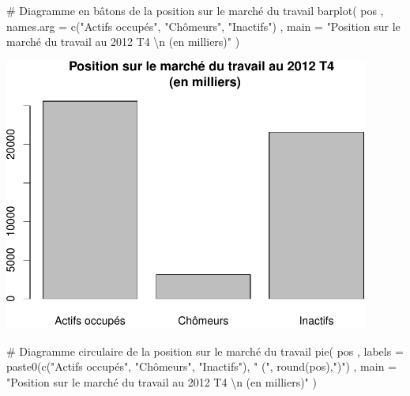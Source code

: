 \documentclass[12pt,twosided, notitlepage]{book}
\newenvironment{Shaded}{}{}
\newcommand{\KeywordTok}[1]{\textcolor[rgb]{0.00,0.00,1.00}{#1}}
\newcommand{\DataTypeTok}[1]{#1}
\newcommand{\CharTok}[1]{\textcolor[rgb]{0.00,0.50,0.50}{#1}}
\newcommand{\StringTok}[1]{\textcolor[rgb]{0.00,0.50,0.50}{#1}}
\newcommand{\CommentTok}[1]{\textcolor[rgb]{0.00,0.50,0.00}{#1}}
\newcommand{\NormalTok}[1]{#1}
\renewenvironment{Shaded}{\begin{snugshade}}{\end{snugshade}}
\begin{document}
\begin{itemize}
\begin{Shaded}
\begin{Highlighting}[]
\CommentTok{# Diagramme en bâtons de la position sur le marché du travail}
\KeywordTok{barplot}\NormalTok{(}
\NormalTok{  pos}
\NormalTok{  , }\DataTypeTok{names.arg =} \KeywordTok{c}\NormalTok{(}\StringTok{"Actifs occupés"}\NormalTok{, }\StringTok{"Chômeurs"}\NormalTok{, }\StringTok{"Inactifs"}\NormalTok{)}
\NormalTok{  , }\DataTypeTok{main =} \StringTok{"Position sur le marché du travail au 2012 T4 }\CharTok{\textbackslash{}n}\StringTok{ (en milliers)"}
\NormalTok{)}
\end{Highlighting}
\end{Shaded}

  \begin{center}\includegraphics[width=12cm]{livret_files/figure-latex/unnamed-chunk-443-1} \end{center}

\begin{Shaded}
\begin{Highlighting}[]

\CommentTok{# Diagramme circulaire de la position sur le marché du travail}
\KeywordTok{pie}\NormalTok{(}
\NormalTok{  pos}
\NormalTok{  , }\DataTypeTok{labels =} \KeywordTok{paste0}\NormalTok{(}\KeywordTok{c}\NormalTok{(}\StringTok{"Actifs occupés"}\NormalTok{, }\StringTok{"Chômeurs"}\NormalTok{, }\StringTok{"Inactifs"}\NormalTok{), }\StringTok{" ("}\NormalTok{, }\KeywordTok{round}\NormalTok{(pos),}\StringTok{")"}\NormalTok{)}
\NormalTok{  , }\DataTypeTok{main =} \StringTok{"Position sur le marché du travail au 2012 T4 }\CharTok{\textbackslash{}n}\StringTok{ (en milliers)"}
\NormalTok{)}
\end{Highlighting}
\end{Shaded}


\end{itemize}
\end{document}
